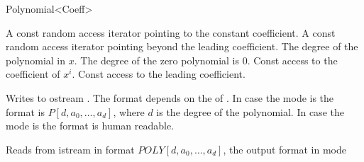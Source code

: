 \begin{ccRefClass}{Polynomial<Coeff>}
\ccTypes

\ccOperations

{A const random access iterator pointing to the constant coefficient.} \ccGlue
{}
{A const random access iterator pointing beyond the leading coefficient.}\ccGlue
{}
{The degree of the polynomial in $x$. The degree of the zero polynomial is 0.}\ccGlue
{}
{Const access to the coefficient of $x^i$.}\ccGlue
{}
{Const access to the leading coefficient.}\ccGlue


{Writes  to ostream . 
The format depends on the  of .
In case the mode is  the format is $P[d,a_0,\dots,a_d]$,
where $d$ is the degree of the polynomial. 
In case the mode is  the format is human readable.}


{Reads  from istream  in format $POLY[d,a_0,\dots,a_d]$,  
the output format in mode  }


\end{ccRefClass}

